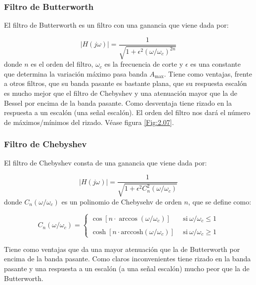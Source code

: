 \documentclass[11pt]{article} %
\newcommand{\arccosh}{\mathrm{arccosh}}
\begin{document}
\subsubsection{Filtro de Butterworth}

El filtro de Butterworth es un filtro con una ganancia que viene dada por:

\begin{equation}
|H(j \omega )| = \dfrac{1}{\sqrt{1+\epsilon^2 (\omega /  \omega_c)^{2n}}}
\end{equation}
donde $n$ es el orden del filtro, $\omega_c$ es la frecuencia de corte y $\epsilon$ es una constante que determina la variación máximo pasa banda $A_{\max}$.  Tiene como ventajas, frente a otros filtros, que su banda pasante es bastante plana, que su respuesta escalón es mucho mejor que el filtro de Chebyshev y una atenuación mayor que la de Bessel por encima de la banda pasante. Como desventaja tiene rizado en la respuesta a un escalón (una señal escalón). El orden del filtro nos dará el número de máximos/mínimos del rizado. Véase figura \ref{Fig:2.07}.

\subsubsection{Filtro de Chebyshev}

El filtro de Chebyshev consta de una ganancia que viene dada por:

\begin{equation}
|H(j\omega)| = \dfrac{1}{\sqrt{1+\epsilon^2 C_n^2 (\omega/\omega_c)}}
\end{equation}
donde $C_n(\omega/\omega_c)$ es un polinomio de Chebysehv de orden $n$, que se define como:

\begin{equation}
C_n (\omega/\omega_c) = \left\lbrace \begin{array}{cl}
\cos [n  \cdot \arccos (\omega/\omega_c)] & \ \ \mathrm{si} \ \omega/\omega_c \leq 1 \\ \\
\cosh [n \cdot  \arccosh (\omega/\omega_c)] & \ \ \mathrm{si} \ \omega/\omega_c \geq 1 
\end{array}  \right.
\end{equation}

Tiene como ventajas que da una mayor atenuación que la de Butterworth por encima de la banda pasante. Como claros inconvenientes tiene rizado en la banda pasante y una respuesta a un escalón (a una señal escalón) mucho peor que la de Butterworth. 
\end{document}
